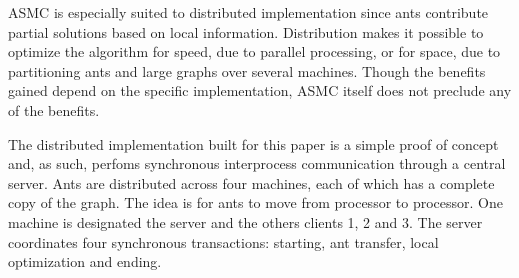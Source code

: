 \documentclass[11pt]{article}
\begin{document}
ASMC is especially suited to distributed implementation since ants contribute
partial solutions based on local information.  Distribution makes it possible
to optimize the algorithm for speed, due to parallel processing, or for space,
due to partitioning ants and large graphs over several machines.  Though the
benefits gained depend on the specific implementation, ASMC itself does not
preclude any of the benefits.






The distributed implementation built for this paper is a simple proof of
concept and, as such, perfoms synchronous interprocess communication through a
central server.  Ants are distributed across four machines, each of which has
a complete copy of the graph.  The idea is for ants to move from processor to
processor.  One machine is designated the server and the others clients 1, 2
and 3.  The server coordinates four synchronous transactions: starting, ant
transfer, local optimization and ending.
\end{document}
